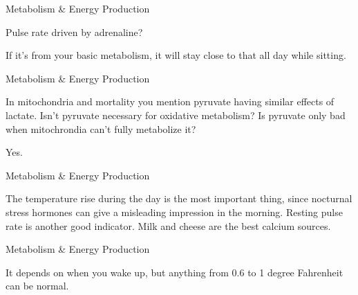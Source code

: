 \documentclass[11pt,oneside,openany,extrafontsizes]{memoir}
\begin{document}
\begin{qaexchange}{Metabolism \& Energy Production}

    \begin{question}
        Pulse rate driven by adrenaline?
    \end{question}

    \begin{answer}
        If it's from your basic metabolism, it will stay close to that all day while sitting.
    \end{answer}
\end{qaexchange}

\begin{qaexchange}{Metabolism \& Energy Production}

    \begin{question}
        In mitochondria and mortality you mention pyruvate having similar effects of lactate. Isn't pyruvate necessary for oxidative metabolism? Is pyruvate only bad when mitochrondia can't fully metabolize it?
    \end{question}

    \begin{answer}
         Yes.
    \end{answer}
\end{qaexchange}

\begin{standalonequote}{Metabolism \& Energy Production}

    \begin{answer}
        The temperature rise during the day is the most important thing, since nocturnal stress hormones can give a misleading impression in the morning. Resting pulse rate is another good indicator. Milk and cheese are the best calcium sources.
    \end{answer}
\end{standalonequote}

\begin{standalonequote}{Metabolism \& Energy Production}

    \begin{answer}
        It depends on when you wake up, but anything from 0.6 to 1 degree Fahrenheit can be normal.
    \end{answer}
\end{standalonequote}
\end{document}
